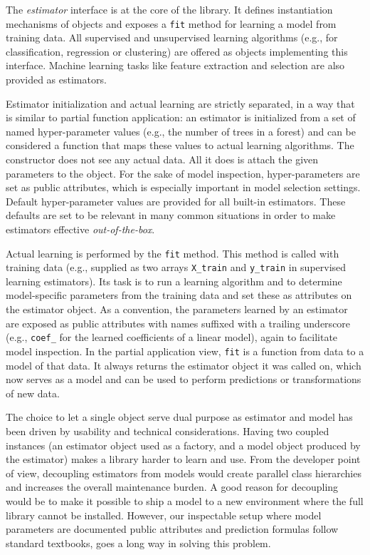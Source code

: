 The \textit{estimator} interface is at the core of the library. It defines
instantiation mechanisms of objects and exposes a \texttt{fit} method for
learning a model from training data.  All supervised and unsupervised learning
algorithms (e.g., for classification, regression or clustering) are offered as
objects implementing this interface. Machine learning tasks like feature
extraction and selection are also provided as estimators.

Estimator initialization and actual learning are strictly separated, in a way
that is similar to partial function application: an estimator is initialized
from a set of named hyper-parameter values (e.g., the number of trees in a
forest) and can be considered a function that maps these values to actual
learning algorithms. The constructor does not see any actual data. All it does
is attach the given parameters to the object. For the sake of model inspection,
hyper-parameters are set as public attributes, which is especially important in
model selection settings. Default hyper-parameter values are provided for all
built-in estimators. These defaults are set to be relevant in many common
situations in order to make estimators effective \textit{out-of-the-box}.

Actual learning is performed by the \texttt{fit} method. This method is called
with training data (e.g., supplied as two arrays \texttt{X\_train} and
\texttt{y\_train} in supervised learning estimators). Its task is to run a
learning algorithm and to determine model-specific parameters from the training
data and set these as attributes on the estimator object. As a convention, the
parameters learned by an estimator are exposed as public attributes with names
suffixed with a trailing underscore (e.g., \texttt{coef\_} for the learned
coefficients of a linear model), again to facilitate model inspection. In the
partial application view, \texttt{fit} is a function from data to a model of
that data. It always returns the estimator object it was called on, which now
serves as a model and can be used to perform predictions or transformations of
new data.

The choice to let a single object serve dual purpose as estimator and model has
been driven by usability and technical considerations. Having two coupled
instances (an estimator object used as a factory, and a model object produced
by the estimator) makes a library harder to learn and use. From the developer
point of view, decoupling estimators from models would create parallel class
hierarchies and increases the overall maintenance burden. A good reason for
decoupling would be to make it possible to ship a model to a new environment
where the full library cannot be installed. However, our inspectable setup
where model parameters are documented public attributes and prediction formulas
follow standard textbooks, goes a long way in solving this problem.

